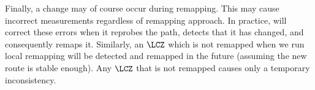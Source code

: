 Finally, a change may of course occur during remapping.  This may cause
incorrect measurements regardless of remapping approach.  In practice,
\dtrack{} will correct these errors when it reprobes the path, detects
that it has changed, and consequently remaps it.  Similarly, an $\LCZ$
which is not remapped when we run local remapping will be detected and
remapped in the future (assuming the new route is stable enough).  Any
$\LCZ$ that is not remapped causes only a temporary inconsistency.
